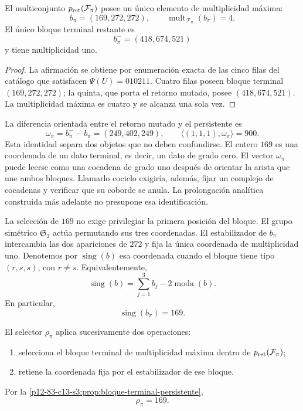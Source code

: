 \begin{proposition}
\label{p12-83-c13-s3:prop:bloque-terminal-persistente}
El multiconjunto \(p_{\rm ret}(\mathcal F_\pi)\) posee un único elemento de
multiplicidad máxima:
\[
b_\pi=(169,272,272),
\qquad
\operatorname{mult}_{\mathcal F_\pi}(b_\pi)=4.
\]
El único bloque terminal restante es
\[
b_\pi^-=(418,674,521)
\]
y tiene multiplicidad uno.
\end{proposition}

\begin{proof}
La afirmación se obtiene por enumeración exacta de las cinco filas del
catálogo que satisfacen \(\Psi(U)=010211\). Cuatro filas poseen bloque
terminal \((169,272,272)\); la quinta, que porta el retorno mutado, posee
\((418,674,521)\). La multiplicidad máxima es cuatro y se alcanza una sola
vez.
\end{proof}

La diferencia orientada entre el retorno mutado y el persistente es
\[
 \omega_\pi=b_\pi^- - b_\pi=(249,402,249),
 \qquad
 \langle(1,1,1),\omega_\pi\rangle=900.
\]
Esta identidad separa dos objetos que no deben confundirse. El entero
\(169\) es una coordenada de un dato terminal, es decir, un dato de grado
cero. El vector \(\omega_\pi\) puede leerse como una cocadena de grado uno
después de orientar la arista que une ambos bloques. Llamarlo cociclo exigiría,
además, fijar un complejo de cocadenas y verificar que su coborde se anula.
La prolongación analítica construida más adelante no presupone esa
identificación.

La selección de \(169\) no exige privilegiar la primera posición del bloque.
El grupo simétrico \(\mathfrak S_3\) actúa permutando sus tres coordenadas.
El estabilizador de \(b_\pi\) intercambia las dos apariciones de \(272\) y
fija la única coordenada de multiplicidad uno. Denotemos por
\(\operatorname{sing}(b)\) esa coordenada cuando el bloque tiene tipo
\((r,s,s)\), con \(r\ne s\). Equivalentemente,
\[
\operatorname{sing}(b)
=\sum_{j=1}^3b_j-2\operatorname{moda}(b).
\]
En particular,
\[
\boxed{\operatorname{sing}(b_\pi)=169.}
\]

\begin{definition}
\label{p12-83-c13-s3:def:selector-residual-pi}
El selector \(\rho_\pi\) aplica sucesivamente dos operaciones:
\begin{enumerate}
  \item selecciona el bloque terminal de multiplicidad máxima dentro de
  \(p_{\rm ret}(\mathcal F_\pi)\);
  \item retiene la coordenada fija por el estabilizador de ese bloque.
\end{enumerate}
Por la \cref{p12-83-c13-s3:prop:bloque-terminal-persistente},
\[
\boxed{\rho_\pi=169.}
\]
\end{definition}

